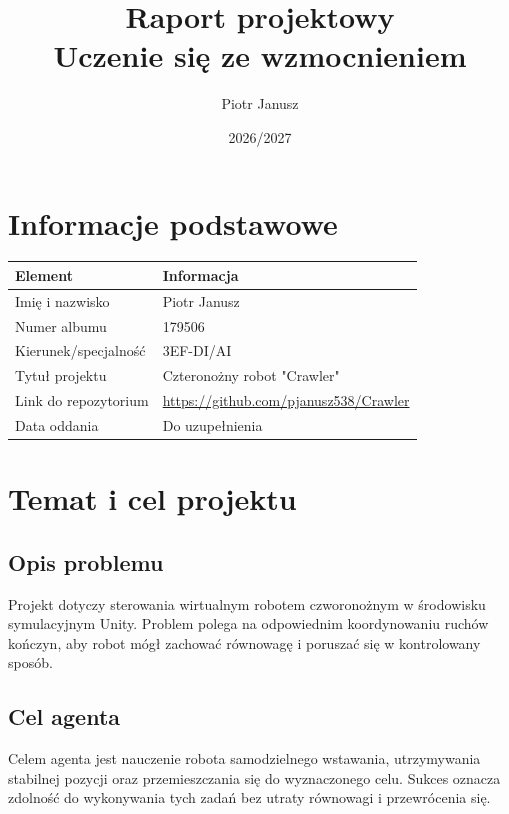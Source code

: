\documentclass[12pt]{article}
\title{Raport projektowy\\Uczenie się ze wzmocnieniem}
\author{Piotr Janusz}
\date{2026/2027}
\begin{document}
\maketitle
\tableofcontents
\newpage

\section{Informacje podstawowe}

\begin{center}
\begin{tabular}{p{}p{}}
\toprule
Element & Informacja \\
\midrule
Imię i nazwisko & Piotr Janusz \\
Numer albumu & 179506 \\
Kierunek/specjalność & 3EF-DI/AI \\
Tytuł projektu & Czteronożny robot "Crawler" \\
Link do repozytorium & \url{https://github.com/pjanusz538/Crawler} \\
Data oddania & Do uzupełnienia \\
\bottomrule
\end{tabular}
\end{center}

\section{Temat i cel projektu}

\subsection{Opis problemu}

Projekt dotyczy sterowania wirtualnym robotem czworonożnym w środowisku 
symulacyjnym Unity. Problem polega na odpowiednim
koordynowaniu ruchów kończyn, aby robot mógł zachować równowagę
i poruszać się w kontrolowany sposób.

\subsection{Cel agenta}

Celem agenta jest nauczenie robota samodzielnego wstawania,
utrzymywania stabilnej pozycji oraz przemieszczania się
do wyznaczonego celu. Sukces oznacza zdolność do wykonywania
tych zadań bez utraty równowagi i przewrócenia się.
\end{document}
